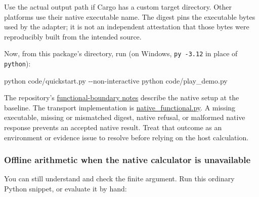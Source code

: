 \documentclass[
  11pt,
]{article}
\newenvironment{Shaded}{}{}
\newcommand{\FunctionTok}[1]{\textcolor[rgb]{0.02,0.16,0.49}{#1}}
\newcommand{\NormalTok}[1]{#1}
\newcommand{\OperatorTok}[1]{\textcolor[rgb]{0.40,0.40,0.40}{#1}}
\begin{document}
Use the actual output path if Cargo has a custom target directory. Other
platforms use their native executable name. The digest pins the
executable bytes used by the adapter; it is not an independent
attestation that those bytes were reproducibly built from the intended
source.

Now, from this package's directory, run (on Windows, \texttt{py\ -3.12}
in place of \texttt{python}):

\begin{Shaded}
\begin{Highlighting}[]
\NormalTok{python code}\OperatorTok{/}\NormalTok{quickstart}\OperatorTok{.}\FunctionTok{py} \OperatorTok{{-}{-}}\NormalTok{non}\OperatorTok{{-}}\NormalTok{interactive}
\NormalTok{python code}\OperatorTok{/}\NormalTok{play\_demo}\OperatorTok{.}\FunctionTok{py}
\end{Highlighting}
\end{Shaded}

The repository's
\href{https://github.com/dbccpage/the_symbol_game/blob/52cb5457f6c485ba548cfd292f6012a941ed22cf/education/FUNCTIONAL_BOUNDARY.md}{functional-boundary
notes} describe the native setup at the baseline. The transport
implementation is
\href{code/native_functional.py}{native\_functional.py}. A missing
executable, missing or mismatched digest, native refusal, or malformed
native response prevents an accepted native result. Treat that outcome
as an environment or evidence issue to resolve before relying on the
host calculation.

\hypertarget{offline-arithmetic-when-the-native-calculator-is-unavailable}{%
\subsubsection{Offline arithmetic when the native calculator is
unavailable}\label{offline-arithmetic-when-the-native-calculator-is-unavailable}}

You can still understand and check the finite argument. Run this
ordinary Python snippet, or evaluate it by hand:
\end{document}
